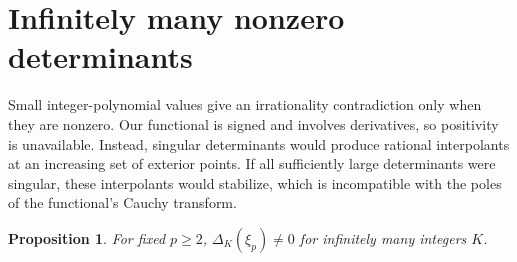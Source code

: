 \documentclass[11pt,letterpaper]{article}
\numberwithin{equation}{section}
\newtheorem{proposition}[theorem]{Proposition}
\theoremstyle{remark}\newtheorem{remark}[theorem]{Remark}
\begin{document}
\section{Infinitely many nonzero determinants}
Small integer-polynomial values give an irrationality contradiction only when they are nonzero. Our functional is signed and involves derivatives, so positivity is unavailable. Instead, singular determinants would produce rational interpolants at an increasing set of exterior points. If all sufficiently large determinants were singular, these interpolants would stabilize, which is incompatible with the poles of the functional's Cauchy transform.

\begin{proposition}\label{prop:nonzero}
For fixed $p\ge2$, $\Delta_K(\xi_p)\ne0$ for infinitely many integers $K$.
\end{proposition}
\end{document}
